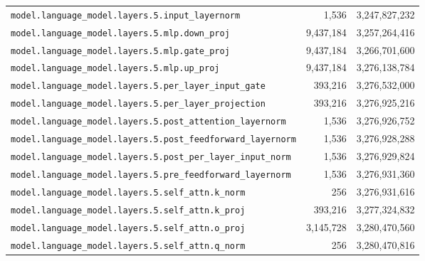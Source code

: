 \documentclass[10pt,a4paper]{article}
\theoremstyle{definition}
\begin{document}
\begin{appendices}
\begin{longtable}{p{9.5cm}rr}
\texttt{model.\allowbreak{}language\_model.\allowbreak{}layers.\allowbreak{}5.\allowbreak{}input\_layernorm} & 1,536 & 3,247,827,232 \\
\texttt{model.\allowbreak{}language\_model.\allowbreak{}layers.\allowbreak{}5.\allowbreak{}mlp.\allowbreak{}down\_proj} & 9,437,184 & 3,257,264,416 \\
\texttt{model.\allowbreak{}language\_model.\allowbreak{}layers.\allowbreak{}5.\allowbreak{}mlp.\allowbreak{}gate\_proj} & 9,437,184 & 3,266,701,600 \\
\texttt{model.\allowbreak{}language\_model.\allowbreak{}layers.\allowbreak{}5.\allowbreak{}mlp.\allowbreak{}up\_proj} & 9,437,184 & 3,276,138,784 \\
\texttt{model.\allowbreak{}language\_model.\allowbreak{}layers.\allowbreak{}5.\allowbreak{}per\_layer\_input\_gate} & 393,216 & 3,276,532,000 \\
\texttt{model.\allowbreak{}language\_model.\allowbreak{}layers.\allowbreak{}5.\allowbreak{}per\_layer\_projection} & 393,216 & 3,276,925,216 \\
\texttt{model.\allowbreak{}language\_model.\allowbreak{}layers.\allowbreak{}5.\allowbreak{}post\_attention\_layernorm} & 1,536 & 3,276,926,752 \\
\texttt{model.\allowbreak{}language\_model.\allowbreak{}layers.\allowbreak{}5.\allowbreak{}post\_feedforward\_layernorm} & 1,536 & 3,276,928,288 \\
\texttt{model.\allowbreak{}language\_model.\allowbreak{}layers.\allowbreak{}5.\allowbreak{}post\_per\_layer\_input\_norm} & 1,536 & 3,276,929,824 \\
\texttt{model.\allowbreak{}language\_model.\allowbreak{}layers.\allowbreak{}5.\allowbreak{}pre\_feedforward\_layernorm} & 1,536 & 3,276,931,360 \\
\texttt{model.\allowbreak{}language\_model.\allowbreak{}layers.\allowbreak{}5.\allowbreak{}self\_attn.\allowbreak{}k\_norm} & 256 & 3,276,931,616 \\
\texttt{model.\allowbreak{}language\_model.\allowbreak{}layers.\allowbreak{}5.\allowbreak{}self\_attn.\allowbreak{}k\_proj} & 393,216 & 3,277,324,832 \\
\texttt{model.\allowbreak{}language\_model.\allowbreak{}layers.\allowbreak{}5.\allowbreak{}self\_attn.\allowbreak{}o\_proj} & 3,145,728 & 3,280,470,560 \\
\texttt{model.\allowbreak{}language\_model.\allowbreak{}layers.\allowbreak{}5.\allowbreak{}self\_attn.\allowbreak{}q\_norm} & 256 & 3,280,470,816 \\

\end{longtable}
\end{appendices}
\end{document}
